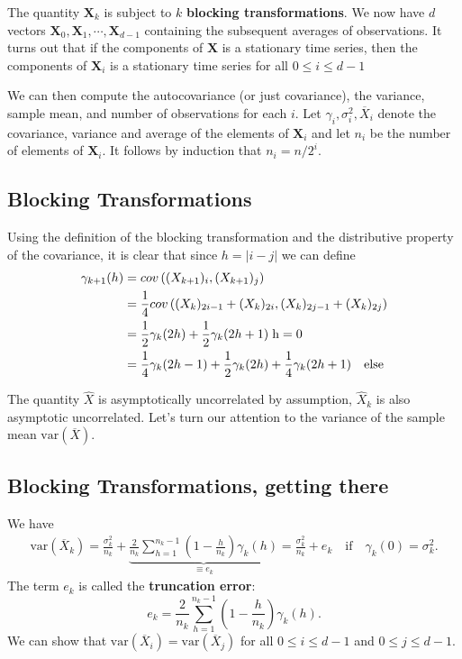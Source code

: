 \documentclass[%
oneside,                 %
final,                   %
10pt]{article}
\begin{document}
The quantity $\bm{X}_k$ is
subject to $k$ \textbf{blocking transformations}.  We now have $d$ vectors
$\bm{X}_0, \bm{X}_1,\cdots,\bm{X}_{d-1}$ containing the subsequent
averages of observations. It turns out that if the components of
$\bm{X}$ is a stationary time series, then the components of
$\bm{X}_i$ is a stationary time series for all $0 \leq i \leq d-1$

We can then compute the autocovariance (or just covariance), the variance, sample mean, and
number of observations for each $i$. 
Let $\gamma_i, \sigma_i^2,
\overline{X}_i$ denote the covariance, variance and average of the
elements of $\bm{X}_i$ and let $n_i$ be the number of elements of
$\bm{X}_i$. It follows by induction that $n_i = n/2^i$. 

\subsection*{Blocking Transformations}

Using the
definition of the blocking transformation and the distributive
property of the covariance, it is clear that since $h =|i-j|$
we can define
\begin{align}
\gamma_{k+1}(h) &= cov\left( ({X}_{k+1})_{i}, ({X}_{k+1})_{j} \right) \nonumber \\
&=  \frac{1}{4}cov\left( ({X}_{k})_{2i-1} + ({X}_{k})_{2i}, ({X}_{k})_{2j-1} + ({X}_{k})_{2j} \right) \nonumber \\
&=  \frac{1}{2}\gamma_{k}(2h) + \frac{1}{2}\gamma_k(2h+1) \hspace{0.1cm} \mathrm{h = 0} \\
&=\frac{1}{4}\gamma_k(2h-1) + \frac{1}{2}\gamma_k(2h) + \frac{1}{4}\gamma_k(2h+1) \quad \mathrm{else}
\end{align}

The quantity $\hat{X}$ is asymptotically uncorrelated by assumption, $\hat{X}_k$ is also asymptotic uncorrelated. Let's turn our attention to the variance of the sample
mean $\mathrm{var}(\overline{X})$. 

\subsection*{Blocking Transformations, getting there}
We have
\begin{align}
\mathrm{var}(\overline{X}_k) = \frac{\sigma_k^2}{n_k} + \underbrace{\frac{2}{n_k} \sum_{h=1}^{n_k-1}\left( 1 - \frac{h}{n_k} \right)\gamma_k(h)}_{\equiv e_k} = \frac{\sigma^2_k}{n_k} + e_k \quad \text{if} \quad \gamma_k(0) = \sigma_k^2. 
\end{align}
The term $e_k$ is called the \textbf{truncation error}: 
\begin{equation}
e_k = \frac{2}{n_k} \sum_{h=1}^{n_k-1}\left( 1 - \frac{h}{n_k} \right)\gamma_k(h). 
\end{equation}
We can show that $\mathrm{var}(\overline{X}_i) = \mathrm{var}(\overline{X}_j)$ for all $0 \leq i \leq d-1$ and $0 \leq j \leq d-1$. 
\end{document}
